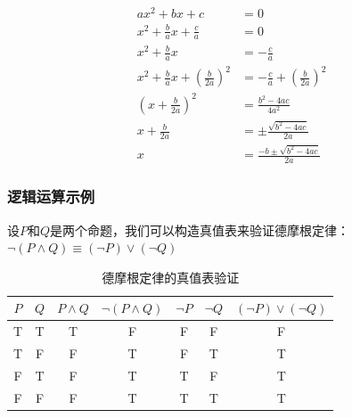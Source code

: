 \documentclass{article}
\begin{document}
\begin{align}
      ax^2 + bx + c                                    & = 0                                          \\
      x^2 + \frac{b}{a}x + \frac{c}{a}                 & = 0                                          \\
      x^2 + \frac{b}{a}x                               & = -\frac{c}{a}                               \\
      x^2 + \frac{b}{a}x + \left(\frac{b}{2a}\right)^2 & = -\frac{c}{a} + \left(\frac{b}{2a}\right)^2 \\
      \left(x + \frac{b}{2a}\right)^2                  & = \frac{b^2 - 4ac}{4a^2}                     \\
      x + \frac{b}{2a}                                 & = \pm\frac{\sqrt{b^2 - 4ac}}{2a}             \\
      x                                                & = \frac{-b \pm \sqrt{b^2 - 4ac}}{2a}
\end{align}

\subsubsection{逻辑运算示例}

设$P$和$Q$是两个命题，我们可以构造真值表来验证德摩根定律：$\neg(P \land Q) \equiv (\neg P) \lor (\neg Q)$

\begin{table}[h]
      \centering
      \begin{tabular}{|c|c|c|c|c|c|c|}
            \hline
            $P$ & $Q$ & $P \land Q$ & $\neg(P \land Q)$ & $\neg P$ & $\neg Q$ & $(\neg P) \lor (\neg Q)$ \\
            \hline
            T   & T   & T           & F                 & F        & F        & F                        \\
            T   & F   & F           & T                 & F        & T        & T                        \\
            F   & T   & F           & T                 & T        & F        & T                        \\
            F   & F   & F           & T                 & T        & T        & T                        \\
            \hline
      \end{tabular}
      \caption{德摩根定律的真值表验证}
\end{table}
\end{document}
